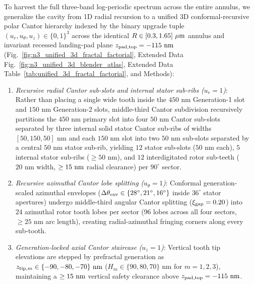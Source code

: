 \documentclass[pdflatex,sn-nature]{sn-jnl}
\begin{document}
To harvest the full three-band log-periodic spectrum across the entire annulus, we generalize the cavity from 1D radial recursion to a unified 3D conformal-recursive polar Cantor hierarchy indexed by the binary upgrade tuple $(u_r, u_\theta, u_z) \in \{0,1\}^3$ across the identical $R \in [0.3{}, 1.65{}]\ \mu\text{m}$ annulus and invariant recessed landing-pad plane $z_{\rm pad,top} = -115\text{ nm}$ (Fig.~\ref{fig:n3_unified_3d_fractal_factorial}, Extended Data Fig.~\ref{fig:n3_unified_3d_blender_atlas}, Extended Data Table~\ref{tab:unified_3d_fractal_factorial}, and Methods):
\begin{enumerate}
    \item \emph{Recursive radial Cantor sub-slots and internal stator sub-ribs ($u_r = 1$)}: Rather than placing a single wide tooth inside the $450\text{ nm}$ Generation-1 slot and $150\text{ nm}$ Generation-2 slots, middle-third Cantor subdivision recursively partitions the $450\text{ nm}$ primary slot into four $50\text{ nm}$ Cantor sub-slots separated by three internal solid stator Cantor sub-ribs of widths $[50, 150, 50]\text{ nm}$ and each $150\text{ nm}$ slot into two $50\text{ nm}$ sub-slots separated by a central $50\text{ nm}$ stator sub-rib, yielding $12$ stator sub-slots ($50\text{ nm}$ each), $5$ internal stator sub-ribs ($\ge 50\text{ nm}$), and $12$ interdigitated rotor sub-teeth ($20\text{ nm}$ width, $\ge 15{}\text{ nm}$ radial clearance) per $90^\circ$ sector.
    \item \emph{Recursive azimuthal Cantor lobe splitting ($u_\theta = 1$)}: Conformal generation-scaled azimuthal envelopes ($\Delta\theta_{\rm env} \in \{28^\circ, 21^\circ, 16^\circ\}$ inside $36^\circ$ stator apertures) undergo middle-third angular Cantor splitting ($\xi_{\rm gap} = 0.20$) into $24$ azimuthal rotor tooth lobes per sector ($96$ lobes across all four sectors, $\ge 25\text{ nm}$ arc length), creating radial-azimuthal fringing corners along every sub-tooth.
    \item \emph{Generation-locked axial Cantor staircase ($u_z = 1$)}: Vertical tooth tip elevations are stepped by prefractal generation as $z_{{\rm tip},m} \in \{-90, -80, -70\}\text{ nm}$ ($H_m \in \{90, 80, 70\}\text{ nm}$ for $m=1,2,3$), maintaining a $\ge 15{}\text{ nm}$ vertical safety clearance above $z_{\rm pad,top} = -115\text{ nm}$.
\end{enumerate}
\end{document}
